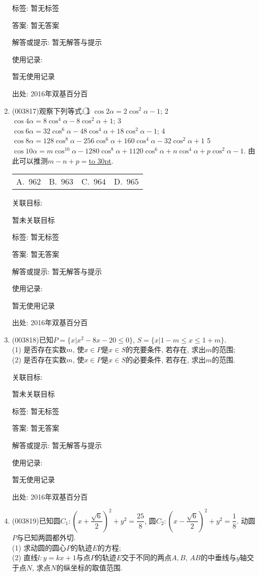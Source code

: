 \documentclass[10pt,a4paper]{article}
\newcommand{\blank}[1]{\underline{\hbox to #1pt{}}}
\newcommand{\fourch}[4]{\par\begin{tabular}{p{.23\textwidth}p{.23\textwidth}p{.23\textwidth}p{.23\textwidth}}
A.~#1 &B.~#2& C.~#3& D.~#4
\end{tabular}}
\begin{document}
\begin{enumerate}[1.]
标签: 暂无标签

答案: 暂无答案

解答或提示: 暂无解答与提示

使用记录:

暂无使用记录


出处: 2016年双基百分百
\item { (003817)}观察下列等式: 
\textcircled{1} $\cos 2\alpha=2\cos^2\alpha-1$; \textcircled{2} $\cos 4\alpha=8\cos^4\alpha-8\cos^2\alpha+1$; \textcircled{3} $\cos 6\alpha=32\cos^6\alpha-48\cos^4\alpha+18\cos^2\alpha-1$; \textcircled{4} $\cos 8\alpha=128\cos^8\alpha-256\cos^6\alpha+160\cos^4\alpha-32\cos^2\alpha+1$ \textcircled{5} $\cos10\alpha=m\cos^{10}\alpha-1280\cos^8\alpha+1120\cos^6\alpha+n\cos^4\alpha+p\cos^2\alpha-1$.
由此可以推测$m-n+p=$\blank{30}.
\fourch{$962$}{$963$}{$964$}{$965$}


关联目标:

暂未关联目标



标签: 暂无标签

答案: 暂无答案

解答或提示: 暂无解答与提示

使用记录:

暂无使用记录


出处: 2016年双基百分百
\item { (003818)}已知$P=\{x|x^2-8x-20\le 0\}$, $S=\{x|1-m\le x\le 1+m\}$.\\
(1) 是否存在实数$m$, 使$x\in P$是$x\in S$的充要条件, 若存在, 求出$m$的范围;\\
(2) 是否存在实数$m$, 使$x\in P$是$x\in S$的必要条件, 若存在, 求出$m$的范围.


关联目标:

暂未关联目标



标签: 暂无标签

答案: 暂无答案

解答或提示: 暂无解答与提示

使用记录:

暂无使用记录


出处: 2016年双基百分百
\item { (003819)}已知圆$C_1: \left(x+\dfrac{\sqrt{6}}{2}\right)^2+y^2=\dfrac{25}{8}$, 圆$C_2: \left(x-\dfrac{\sqrt{6}}{2}\right)^2+y^2=\dfrac{1}{8}$. 动圆$P$与已知两圆都外切.\\
(1) 求动圆的圆心$P$的轨迹$E$的方程;\\
(2) 直线$l: y=kx+1$与点$P$的轨迹$E$交于不同的两点$A,B$, $AB$的中垂线与$y$轴交于点$N$, 求点$N$的纵坐标的取值范围.



\end{enumerate}
\end{document}
